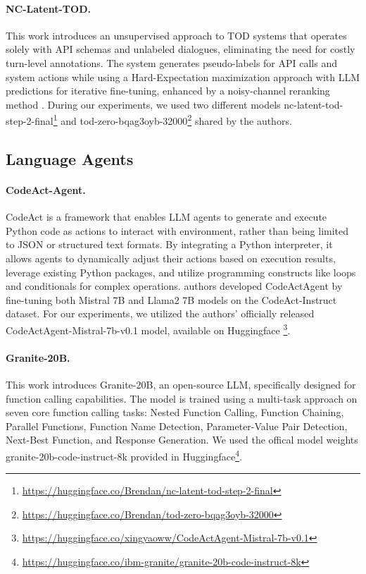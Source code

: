 \paragraph{NC-Latent-TOD.} This work introduces an unsupervised approach to TOD systems that operates solely with API schemas and unlabeled dialogues, eliminating the need for costly turn-level annotations. The system generates pseudo-labels for API calls and system actions while using a Hard-Expectation maximization approach with LLM predictions for iterative fine-tuning, enhanced by a noisy-channel reranking method \cite{king-flanigan-2024-unsupervised}. During our experiments, we used two different models nc-latent-tod-step-2-final\footnote{\url{https://huggingface.co/Brendan/nc-latent-tod-step-2-final}} and tod-zero-bqag3oyb-32000\footnote{\url{https://huggingface.co/Brendan/tod-zero-bqag3oyb-32000}} shared by the authors.


\subsection{Language Agents}

\paragraph{CodeAct-Agent.} CodeAct \cite{wang2024executable} is a framework that enables LLM agents to generate and execute Python code as actions to interact with environment, rather than being limited to JSON or structured text formats. By integrating a Python interpreter, it allows agents to dynamically adjust their actions based on execution results, leverage existing Python packages, and utilize programming constructs like loops and conditionals for complex operations. authors developed CodeActAgent by fine-tuning both Mistral 7B and Llama2 7B models on the CodeAct-Instruct dataset. For our experiments, we utilized the authors' officially released CodeActAgent-Mistral-7b-v0.1 model, available on Huggingface \footnote{\url{https://huggingface.co/xingyaoww/CodeActAgent-Mistral-7b-v0.1}}.

\paragraph{Granite-20B.} This work introduces Granite-20B, an open-source LLM, specifically designed for function calling capabilities. The model is trained using a multi-task approach on seven core function calling tasks: Nested Function Calling, Function Chaining, Parallel Functions, Function Name Detection, Parameter-Value Pair Detection, Next-Best Function, and Response Generation. We used the offical model weights granite-20b-code-instruct-8k provided in Huggingface\footnote{\url{https://huggingface.co/ibm-granite/granite-20b-code-instruct-8k}}.

